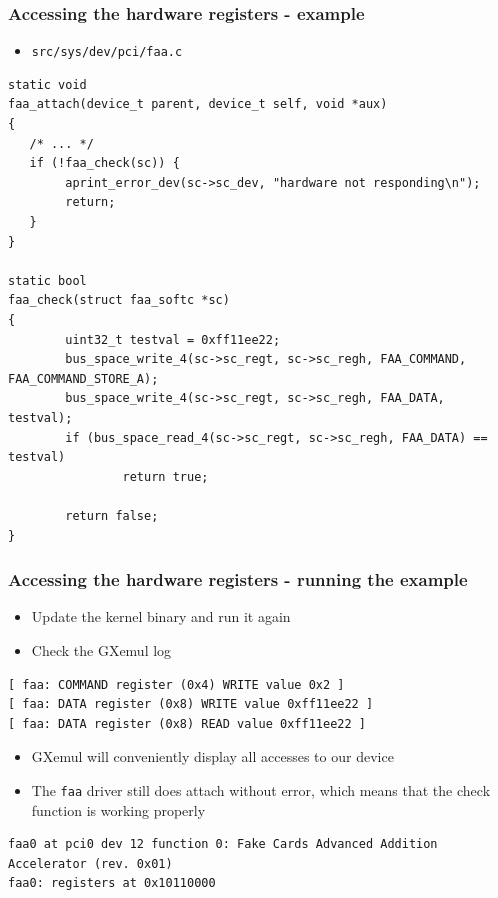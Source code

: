 \documentclass[dvipsnames,table]{beamer}
\begin{document}
\begin{frame}[fragile]
\frametitle{Accessing the hardware registers - example}
\begin{itemize}
	\item {\tt src/sys/dev/pci/faa.c}
\end{itemize}
\begin{lstlisting}
static void
faa_attach(device_t parent, device_t self, void *aux)
{
   /* ... */
   if (!faa_check(sc)) {
   		aprint_error_dev(sc->sc_dev, "hardware not responding\n");
        return;
   }
}

static bool
faa_check(struct faa_softc *sc)
{
        uint32_t testval = 0xff11ee22; 
        bus_space_write_4(sc->sc_regt, sc->sc_regh, FAA_COMMAND, FAA_COMMAND_STORE_A);
        bus_space_write_4(sc->sc_regt, sc->sc_regh, FAA_DATA, testval);
        if (bus_space_read_4(sc->sc_regt, sc->sc_regh, FAA_DATA) == testval)
                return true;

        return false;
}
\end{lstlisting}
\end{frame}

\begin{frame}[fragile]
\frametitle{Accessing the hardware registers - running the example}
\begin{itemize}
	\item Update the kernel binary and run it again
	\item Check the GXemul log
\end{itemize}
\begin{verbatim}
[ faa: COMMAND register (0x4) WRITE value 0x2 ]
[ faa: DATA register (0x8) WRITE value 0xff11ee22 ]
[ faa: DATA register (0x8) READ value 0xff11ee22 ]
\end{verbatim}
\begin{itemize}
	\item GXemul will conveniently display all accesses to our device
	\item The {\tt faa} driver still does attach without error, which means that the check function is working properly
\end{itemize}
\tiny
\begin{verbatim}
faa0 at pci0 dev 12 function 0: Fake Cards Advanced Addition Accelerator (rev. 0x01)
faa0: registers at 0x10110000
\end{verbatim}
\end{frame}
\end{document}
